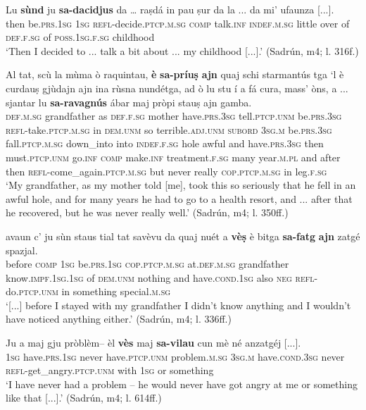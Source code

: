 \ea\label{ex:refessar2}
\gll Lu \textbf{sùnd} ju \textbf{sa-dacidjus} da … raṣdá in pau ṣur da la ... da mi’ ufaunza [...].   \\
then  be.\textsc{prs.1sg}  \textsc{1sg}  \textsc{refl}-decide.\textsc{ptcp.m.sg}  \textsc{comp} {} talk.\textsc{inf} \textsc{indef.m.sg} little over of  \textsc{def.f.sg} {} of \textsc{poss.1sg.f.sg} childhood\\
\glt `Then I decided to ... talk a bit about ... my childhood [...].' (Sadrún, m4; l. 316f.)
\z

\ea\label{ex:refessar3}
\gll  Al tat, scù la mùma ò raquintau, \textbf{è}  \textbf{sa-príuṣ} \textbf{ajn} quaj schi starmantús tga `l è curdauṣ gjùdajn ajn ina rùsna nundétga, ad ò lu stu í a fá cura, mass’ òns, a ... sjantar lu  \textbf{sa-ravagnús} ábar maj pròpi stauṣ ajn gamba.  \\
\textsc{def.m.sg} grandfather as  \textsc{def.f.sg} mother have.\textsc{prs.3sg} tell.\textsc{ptcp.unm} be.\textsc{prs.3sg} \textsc{refl-}take.\textsc{ptcp.m.sg} in \textsc{dem.unm} so terrible.\textsc{adj.unm} \textsc{subord} \textsc{3sg.m} be.\textsc{prs.3sg} fall.\textsc{ptcp.m.sg} down\_into into \textsc{indef.f.sg} hole awful and have.\textsc{prs.3sg} then must.\textsc{ptcp.unm} go.\textsc{inf} \textsc{comp} make.\textsc{inf} treatment.\textsc{f.sg} many year.\textsc{m.pl} and {} after then \textsc{refl}-come\_again.\textsc{ptcp.m.sg} but never really \textsc{cop.ptcp.m.sg} in leg.\textsc{f.sg}\\
\glt `My grandfather, as my mother told [me], took this so seriously that he fell in an awful hole, and for many years he had to go to a health resort, and ... after that he recovered, but he was never really well.' (Sadrún, m4; l. 350ff.)
\z

\ea\label{ex:refvaj1}
\gll  [...] avaun c’ ju sùn staus tial tat savèvu da quaj nuét a \textbf{vèṣ} è bitga \textbf{sa-fatg} \textbf{ajn} zatgé spazjal.\\
{} before \textsc{comp} \textsc{1sg} be.\textsc{prs.1sg} \textsc{cop.ptcp.m.sg} at.\textsc{def.m.sg} grandfather know.\textsc{impf.1sg.1sg} of \textsc{dem.unm} nothing and have.\textsc{cond.1sg} also \textsc{neg} \textsc{refl-}do.\textsc{ptcp.unm} in something special.\textsc{m.sg}\\
\glt `[...] before I stayed with my grandfather I didn’t know anything and I wouldn’t have noticed anything either.' (Sadrún, m4; l. 336ff.)
\z

\ea\label{ex:refvaj2}
\gll Ju a maj gju pròblèm– èl \textbf{vès} maj \textbf{sa-vilau} cun mè né anzatgéj [...].   \\
\textsc{1sg} have.\textsc{prs.1sg} never have.\textsc{ptcp.unm} problem.\textsc{m.sg} \textsc{3sg.m} have.\textsc{cond.3sg} never \textsc{refl-}get\_angry.\textsc{ptcp.unm} with \textsc{1sg} or something\\
\glt `I have never had a problem – he would never have got angry at me or something like that [...].' (Sadrún, m4; l. 614ff.)
\z

